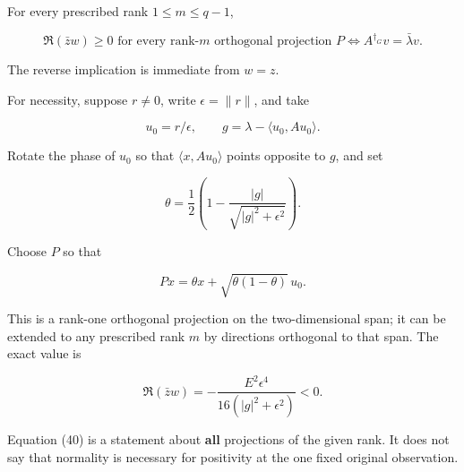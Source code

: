 For every prescribed rank \(1\le m\le q-1\),

\[
\boxed{
\Re(\bar zw)\ge0
\text{ for every rank-}m\text{ orthogonal projection }P
\iff
A^{\dagger_G}v=\bar\lambda v.
}
\tag{40}
\]

The reverse implication is immediate from \(w=z\).

For necessity, suppose \(r\ne0\), write \(\epsilon=\|r\|\), and take

\[
u_0=r/\epsilon,\qquad g=\lambda-\langle u_0,Au_0\rangle.
\]

Rotate the phase of \(u_0\) so that \(\langle x,Au_0\rangle\) points opposite to \(g\), and set

\[
\theta=
\frac12\left(
1-\frac{|g|}{\sqrt{|g|^2+\epsilon^2}}
\right).
\]

Choose \(P\) so that

\[
Px=\theta x+\sqrt{\theta(1-\theta)}\,u_0.
\]

This is a rank-one orthogonal projection on the two-dimensional span; it can be extended to any prescribed rank \(m\) by directions orthogonal to that span. The exact value is

\[
\boxed{
\Re(\bar zw)
=
-\frac{E^2\epsilon^4}{16(|g|^2+\epsilon^2)}<0.
}
\tag{41}
\]

Equation (40) is a statement about \textbf{all} projections of the given rank. It does not say that normality is necessary for positivity at the one fixed original observation.
